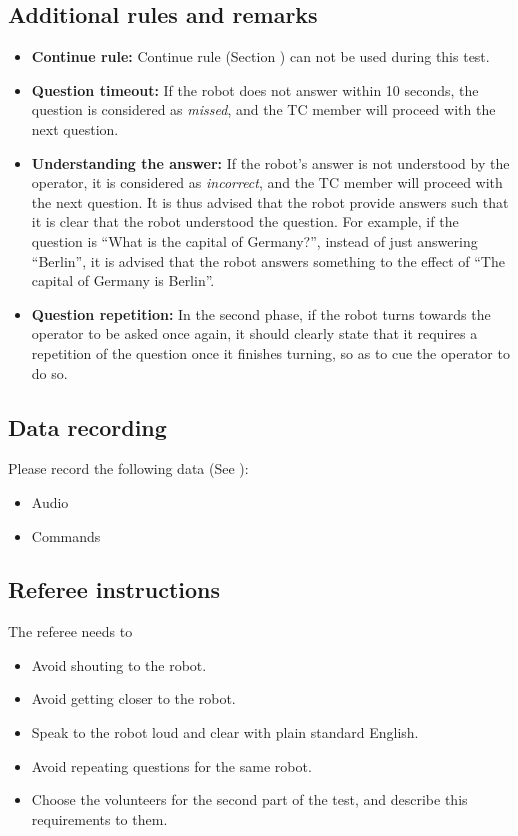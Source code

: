 \subsection{Additional rules and remarks}

\begin{itemize}
\item \textbf{Continue rule:} Continue rule (Section ) can not be used during this test.
\item \textbf{Question timeout:} If the robot does not answer within 10 seconds, the question is considered as \textit{missed}, and the TC member will proceed with the next question.
\item \textbf{Understanding the answer:} If the robot's answer is not understood by the operator, it is considered as \textit{incorrect}, and the TC member will proceed with the next question. It is thus advised that the robot provide answers such that it is clear that the robot understood the question. For example, if the question is ``What is the capital of Germany?'', instead of just answering ``Berlin'', it is advised that the robot answers something to the effect of ``The capital of Germany is Berlin''.
\item \textbf{Question repetition:} In the second phase, if the robot turns towards the operator to be asked once again, it should clearly state that it requires a repetition of the question once it finishes turning, so as to cue the operator to do so.
\end{itemize}

\subsection{Data recording}
  Please record the following data (See ):
  \begin{itemize}
   \item Audio
   \item Commands
  \end{itemize}

\subsection{Referee instructions}

The referee needs to
\begin{itemize}
\item Avoid shouting to the robot.
\item Avoid getting closer to the robot.
\item Speak to the robot loud and clear with plain standard English.
\item Avoid repeating questions for the same robot.
\item Choose the volunteers for the second part of the test, and describe this requirements to them.
\end{itemize}

